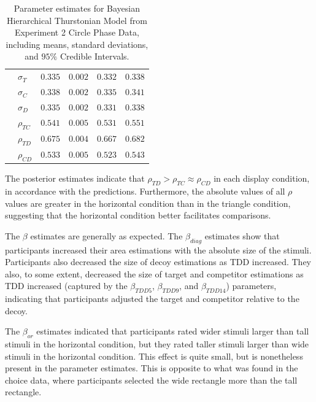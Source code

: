 \begin{table}[ht]
\begin{tabular}{llrrrr}
                    &  $\sigma_{T}$    &    $0.335$   &   $0.002$   &  $0.332$     & $0.338$     \\
                    &  $\sigma_{C}$    &    $0.338$   &   $0.002$   &  $0.335$     & $0.341$     \\
                    &  $\sigma_{D}$    &    $0.335$   &   $0.002$   &  $0.331$     & $0.338$     \\
                    &  $\rho_{TC}$     &    $0.541$   &   $0.005$   &  $0.531$     & $0.551$     \\
                    &  $\rho_{TD}$     &    $0.675$   &   $0.004$   &  $0.667$     & $0.682$     \\
                    &  $\rho_{CD}$     &    $0.533$   &   $0.005$   &  $0.523$     & $0.543$     \\
        \bottomrule
    \end{tabular}
    \caption{Parameter estimates for Bayesian Hierarchical Thurstonian Model from Experiment 2 Circle Phase Data, including means, standard deviations, and $95\%$ Credible Intervals.}
    \label{tab:e2_params}
\end{table}

The posterior estimates indicate that $\rho_{TD}>\rho_{TC}\approx\rho_{CD}$ in each display condition, in accordance with the predictions. Furthermore, the absolute values of all $\rho$ values are greater in the horizontal condition than in the triangle condition, suggesting that the horizontal condition better facilitates comparisons. 

The $\beta$ estimates are generally as expected. The $\beta_{diag}$ estimates show that participants increased their area estimations with the absolute size of the stimuli. Participants also decreased the size of decoy estimations as TDD increased. They also, to some extent, decreased the size of target and competitor estimations as TDD increased (captured by the $\beta_{TDD5}$, $\beta_{TDD9}$, and $\beta_{TDD14}$) parameters, indicating that participants adjusted the target and competitor relative to the decoy.

The $\beta_{or}$ estimates indicated that participants rated wider stimuli larger than tall stimuli in the horizontal condition, but they rated taller stimuli larger than wide stimuli in the horizontal condition. This effect is quite small, but is nonetheless present in the parameter estimates. This is opposite to what was found in the choice data, where participants selected the wide rectangle more than the tall rectangle.

